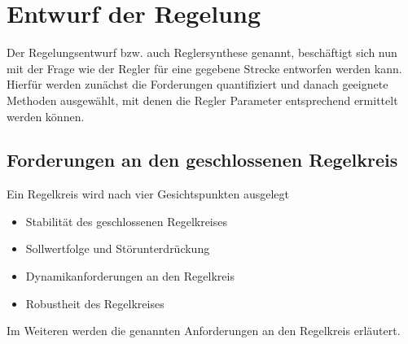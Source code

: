 \chapter{Entwurf der Regelung}
\label{chap:Reglerentwurf}
%
Der Regelungsentwurf bzw. auch Reglersynthese genannt, beschäftigt sich nun mit der Frage wie der Regler für eine gegebene Strecke entworfen werden kann. Hierfür werden zunächst die Forderungen quantifiziert und danach geeignete Methoden ausgewählt, mit denen die Regler Parameter entsprechend ermittelt werden können. 
%
\section{Forderungen an den geschlossenen Regelkreis}
\label{sec:Forderungen}
%
Ein Regelkreis wird nach vier Gesichtspunkten ausgelegt \cite{MSF05,Lunze10}
%
\begin{itemize}
	\item Stabilität des geschlossenen Regelkreises
	\item Sollwertfolge und Störunterdrückung
	\item Dynamikanforderungen an den Regelkreis
	\item Robustheit des Regelkreises
\end{itemize}
%
Im Weiteren werden die genannten Anforderungen an den Regelkreis erläutert.
%

